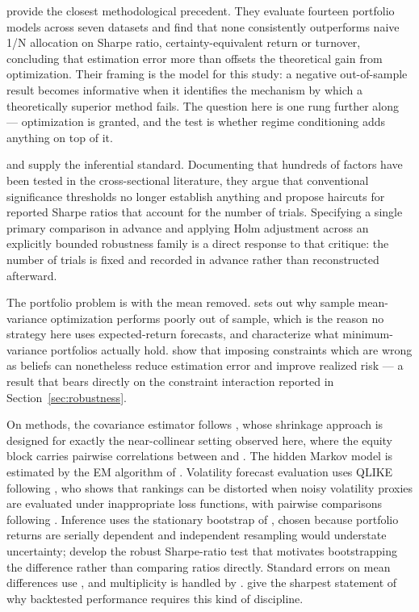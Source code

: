 \citet{demiguel2009} provide the closest methodological precedent. They
evaluate fourteen portfolio models across seven datasets and find that
none consistently outperforms naive 1/N allocation on Sharpe ratio,
certainty-equivalent return or turnover, concluding that estimation
error more than offsets the theoretical gain from optimization. Their
framing is the model for this study: a negative out-of-sample result
becomes informative when it identifies the mechanism by which a
theoretically superior method fails. The question here is one rung
further along --- optimization is granted, and the test is whether
regime conditioning adds anything on top of it.

\citet{harvey2015} and \citet{harvey2016} supply the inferential
standard. Documenting that hundreds of factors have been tested in the
cross-sectional literature, they argue that conventional significance
thresholds no longer establish anything and propose haircuts for
reported Sharpe ratios that account for the number of trials.
Specifying a single primary comparison in advance and applying Holm adjustment
across an explicitly bounded robustness family is a direct response to
that critique: the number of trials is fixed and recorded in advance
rather than reconstructed afterward.

The portfolio problem is \citet{markowitz1952} with the mean removed.
\citet{michaud1989} sets out why sample mean-variance optimization
performs poorly out of sample, which is the reason no strategy here uses
expected-return forecasts, and \citet{clarke2011} characterize what
minimum-variance portfolios actually hold. \citet{jagannathan2003} show
that imposing constraints which are wrong as beliefs can nonetheless
reduce estimation error and improve realized risk --- a result that
bears directly on the constraint interaction reported in
Section~\ref{sec:robustness}.

On methods, the covariance estimator follows \citet{ledoit2004}, whose
shrinkage approach is designed for exactly the near-collinear setting
observed here, where the equity block carries pairwise correlations
between \equityCorrMin{} and \equityCorrMax{}. The hidden Markov model is estimated by the EM
algorithm of \citet{dempster1977}. Volatility forecast evaluation uses
QLIKE following \citet{patton2011}, who shows that rankings can be
distorted when noisy volatility proxies are evaluated under
inappropriate loss functions, with pairwise comparisons following
\citet{diebold1995}. Inference uses the stationary bootstrap of
\citet{politis1994}, chosen because portfolio returns are serially
dependent and independent resampling would understate uncertainty;
\citet{ledoit2008} develop the robust Sharpe-ratio test that motivates
bootstrapping the difference rather than comparing ratios directly.
Standard errors on mean differences use \citet{newey1987}, and
multiplicity is handled by \citet{holm1979}. \citet{bailey2014} give
the sharpest statement of why backtested performance requires this kind
of discipline.
